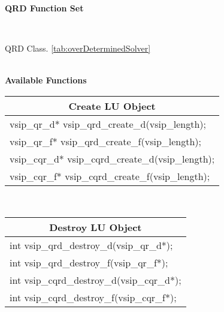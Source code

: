 \clearpage
\hypertarget{qrdFunc}{\large \textbf{QRD Function Set}}\vspace{.2cm}\\
\hspace*{.3cm}
\parbox{0.85\textwidth}{QRD Class. \ref{tab:overDeterminedSolver}}
\\\cvsiplh 
\newline \hspace*{.8cm} \vspace*{.1cm} \textbf{Available Functions }
%
\newline \hspace*{1.cm} {
\ttfamily\vspace{.3cm}
\begin{tabular}[H]{|l|}
\multicolumn{1}{c}{\rmfamily \bfseries Create LU Object\vspace{.1cm}}\\ \hline
vsip\_qr\_d* vsip\_qrd\_create\_d(vsip\_length);\\
vsip\_qr\_f* vsip\_qrd\_create\_f(vsip\_length);\\
vsip\_cqr\_d* vsip\_cqrd\_create\_d(vsip\_length);\\
vsip\_cqr\_f* vsip\_cqrd\_create\_f(vsip\_length);\\
\hline\end{tabular}\\}
%
\newline \hspace*{1.cm} {
\ttfamily\vspace{.3cm}
\begin{tabular}[H]{|l|}
\multicolumn{1}{c}{\rmfamily \bfseries Destroy LU Object\vspace{.1cm}}\\ \hline
int vsip\_qrd\_destroy\_d(vsip\_qr\_d*);\\
int vsip\_qrd\_destroy\_f(vsip\_qr\_f*);\\
int vsip\_cqrd\_destroy\_d(vsip\_cqr\_d*);\\
int vsip\_cqrd\_destroy\_f(vsip\_cqr\_f*);\\
\hline\end{tabular}\\}
%

